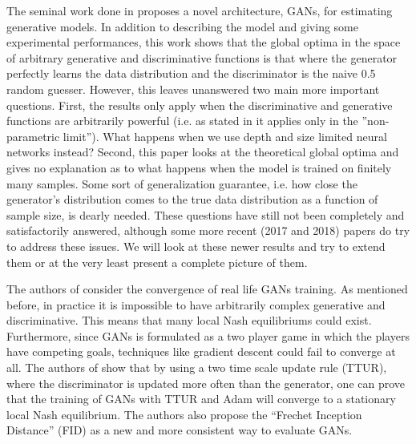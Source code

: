 \documentclass[11pt]{hw-template}
\begin{document}
\maketitle

The seminal work done in \cite{NIPS2014_5423} proposes a novel architecture, GANs, for estimating generative models. In addition to describing the model and giving some experimental performances, 
this work shows that the global optima in the space of arbitrary generative and discriminative functions is that where the generator perfectly learns the data distribution and the discriminator is 
the naive 0.5 random guesser. However, this leaves unanswered two main more important questions. First, the results only apply when the discriminative and generative functions are arbitrarily powerful 
(i.e. as stated in \cite{NIPS2014_5423} it applies only in the ''non-parametric limit''). What happens when we use depth and size limited neural networks instead? Second, this paper looks at the 
theoretical global optima and gives no explanation as to what happens when the model is trained on finitely many samples. Some sort of generalization guarantee, i.e. how close the generator's distribution 
comes to the true data distribution as a function of sample size, is dearly needed. These questions have still not been completely and satisfactorily answered, although some more recent (2017 and 2018) papers
do try to address these issues. We will look at these newer results and try to extend them or at the very least present a complete picture of them.

The authors of \cite{NIPS2017_7240} consider the convergence of real life GANs training. As mentioned before, in practice it is impossible to have arbitrarily complex generative and discriminative. This means
that many local Nash equilibriums could exist. Furthermore, since GANs is formulated as a two player game in which the players have competing goals, techniques like gradient descent could fail to converge at all.
The authors of \cite{NIPS2017_7240} show that by using a two time scale update rule (TTUR), where the discriminator is updated more often than the generator, one can prove that the training of GANs 
with TTUR and Adam will converge to 
a stationary local Nash equilibrium. The authors also propose the ``Frechet Inception Distance'' (FID) as a new and more consistent way to evaluate GANs.


 
\end{document}
